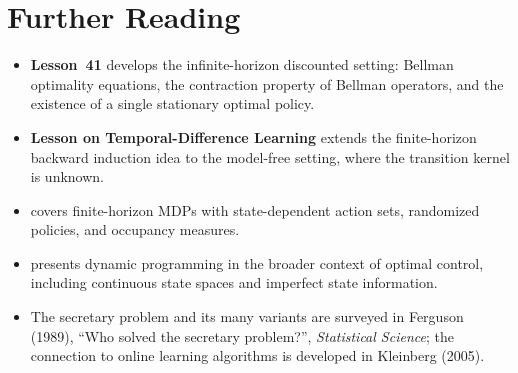 \documentclass[11pt,a4paper]{article}
\begin{document}

\section{Further Reading}
\label{sec:further-reading}

\begin{itemize}
    \item \textbf{Lesson~41} develops the infinite-horizon discounted
    setting: Bellman optimality equations, the contraction property
    of Bellman operators, and the existence of a single stationary
    optimal policy.
    \item \textbf{Lesson on Temporal-Difference Learning} extends the
    finite-horizon backward induction idea to the model-free setting,
    where the transition kernel is unknown.
    \item \citet[Chapter 4]{puterman2014} covers finite-horizon MDPs
    with state-dependent action sets, randomized policies, and
    occupancy measures.
    \item \citet[Chapter 1]{bertsekas2012} presents dynamic programming
    in the broader context of optimal control, including continuous
    state spaces and imperfect state information.
    \item The secretary problem and its many variants are surveyed in
    Ferguson (1989), ``Who solved the secretary problem?'',
    \emph{Statistical Science}; the connection to online learning
    algorithms is developed in Kleinberg (2005).
\end{itemize}


\end{document}
